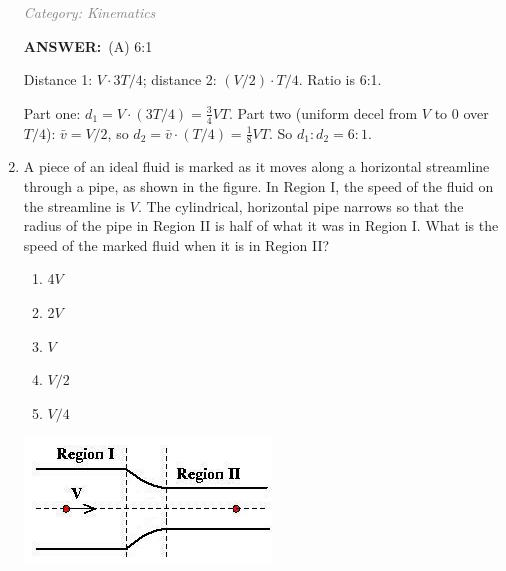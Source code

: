﻿\documentclass[12pt, a4paper]{article}
\makeatletter
\newcommand{\finalanswer}[1]{\textbf{ANSWER:}~#1}
\newif\if@categoryprinted
\newcommand{\category}[1]{\if@categoryprinted\relax\else\textit{\textcolor{gray}{Category: #1}}\global\@categoryprintedtrue\fi}
\newcommand{\tags}[1]{}
\makeatother
\begin{document}
\begin{CJK*}{UTF8}{gbsn}
\begin{enumerate}[itemsep=1.0em, topsep=0.6em]
\category{Kinematics} \tags{}
\begin{answerbox}
\finalanswer{(A) 6:1}
\end{answerbox}
\begin{insightbox}
Distance 1: $V\cdot 3T/4$; distance 2: $(V/2)\cdot T/4$. Ratio is 6:1.
\end{insightbox}
\begin{solutionbox}

Part one: $d_1=V\cdot (3T/4)=\tfrac{3}{4}VT$. Part two (uniform decel from $V$ to 0 over $T/4$): $\bar v = V/2$, so $d_2=\bar v\cdot (T/4)=\tfrac{1}{8}VT$. So $d_1:d_2=6:1$.
\end{solutionbox}

\newpage

\item \label{prob:11}
\noindent\begin{minipage}[t]{0.6\linewidth}
\vspace{0pt}
A piece of an ideal fluid is marked as it moves along a horizontal streamline through a pipe, as shown in the figure. In Region I, the speed of the fluid on the streamline is $V$. The cylindrical, horizontal pipe narrows so that the radius of the pipe in Region II is half of what it was in Region I. What is the speed of the marked fluid when it is in Region II?
\begin{enumerate}[label=(\Alph*)]
    \item 4$V$
    \item 2$V$
    \item $V$
    \item $V/2$
    \item $V/4$
\end{enumerate}
\end{minipage}%
\hfill
\begin{minipage}[t]{0.35\linewidth}
\vspace{0pt}
\centering
\includegraphics[width=\linewidth]{Problem_11_Figure.png}
\end{minipage}


\end{enumerate}
\end{CJK*}
\end{document}

